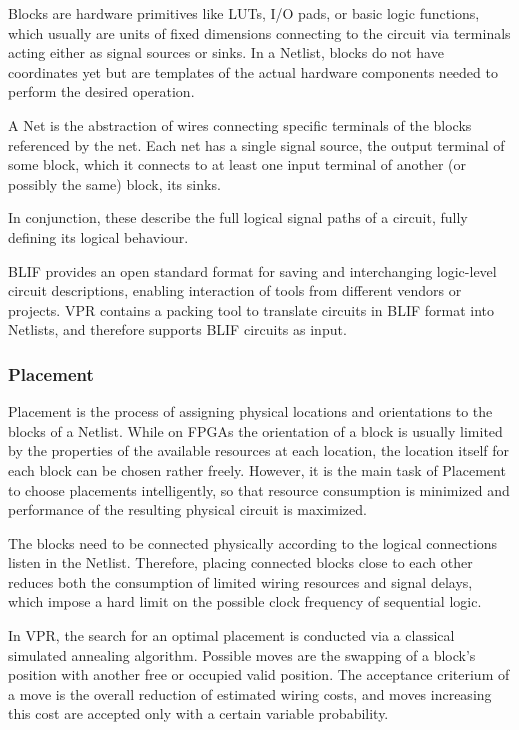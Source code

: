 Blocks are hardware primitives like \glspl{LUT}, \gls{I/O} pads, or basic logic functions, which usually are units of fixed dimensions connecting to the circuit via terminals acting either as signal sources or sinks. In a Netlist, blocks do not have coordinates yet but are templates of the actual hardware components needed to perform the desired operation.

A Net is the abstraction of wires connecting specific terminals of the blocks referenced by the net. Each net has a single signal source, the output terminal of some block, which it connects to at least one input terminal of another (or possibly the same) block, its sinks.

In conjunction, these describe the full logical signal paths of a circuit, fully defining its logical behaviour.

\gls{BLIF} provides an open standard format for saving and interchanging logic-level circuit descriptions, enabling interaction of tools from different vendors or projects.\cite{blif-web} \gls{VPR} contains a packing tool to translate circuits in \gls{BLIF} format into Netlists, and therefore supports \gls{BLIF} circuits as input.

\subsubsection{Placement}

Placement is the process of assigning physical locations and orientations to the blocks of a Netlist. While on \glspl{FPGA} the orientation of a block is usually limited by the properties of the available resources at each location, the location itself for each block can be chosen rather freely. However, it is the main task of Placement to choose placements intelligently, so that resource consumption is minimized and performance of the resulting physical circuit is maximized.

The blocks need to be connected physically according to the logical connections listen in the Netlist. Therefore, placing connected blocks close to each other reduces both the consumption of limited wiring resources and signal delays, which impose a hard limit on the possible clock frequency of sequential logic.

In \gls{VPR}, the search for an optimal placement is conducted via a classical simulated annealing algorithm. Possible moves are the swapping of a block's position with another free or occupied valid position. The acceptance criterium of a move is the overall reduction of estimated wiring costs, and moves increasing this cost are accepted only with a certain variable probability.

